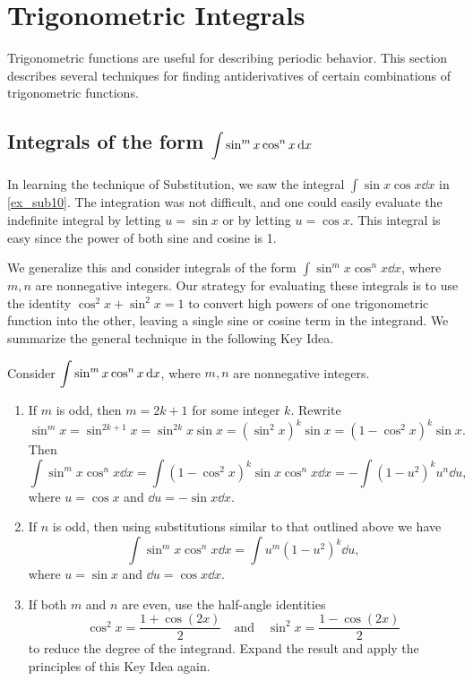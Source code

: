 

\section{Trigonometric Integrals}\label{sec:trigint}

Trigonometric functions are useful for describing periodic behavior. This section describes several techniques for finding antiderivatives of certain combinations of trigonometric functions.

\subsection{Integrals of the form \texorpdfstring{$\displaystyle \int \sin^m x\cos^n x\operatorname{d}\! x$}{∫(sin x)\^{}m (cos x)\^{}n dx}}

In learning the technique of Substitution, we saw the integral $\int \sin x\cos x\dd x$ in \autoref{ex_sub10}. The integration was not difficult, and one could easily evaluate the indefinite integral by letting $u=\sin x$ or by letting $u = \cos x$. This integral is easy since the power of both sine and cosine is 1.

We generalize this and consider integrals of the form $\int \sin^mx\cos^nx\dd x$, where $m,n$ are nonnegative integers. Our strategy for evaluating these integrals is to use the identity $\cos^2x+\sin^2x=1$ to convert high powers of one trigonometric function into the other, leaving a single sine or cosine term in the integrand. We summarize the general technique in the following Key Idea.



{%
\begin{keyidea}\label{idea:trig_int_1}%
Consider $\displaystyle \int \sin^mx\cos^nx\operatorname{d}\! x$, where $m,n$ are nonnegative integers.
\begin{enumerate}
	\item	If $m$ is odd, then $m=2k+1$ for some integer $k$. Rewrite \small
		\[
		\sin^mx = \sin^{2k+1}x = \sin^{2k}x\sin x = (\sin^2x)^k\sin x = (1-\cos^2x)^k\sin x.
		\]
		\normalsize Then \small
		\[
		\int \sin^mx\cos^nx\dd x = \int (1-\cos^2x)^k\sin x\cos^nx\dd x = -\int (1-u^2)^ku^n\dd u,
		\]
		\normalsize where $u = \cos x$ and $\dd u = -\sin x\dd x$. 
	\item	If $n$ is odd, then using substitutions similar to that outlined above we have \small
		\[\int \sin^mx\cos^nx\dd x = \int u^m(1-u^2)^k\dd u,\]
		\normalsize where $u = \sin x$ and $\dd u = \cos x\dd x$.
	\item	If both $m$ and $n$ are even, use the half-angle identities \small
		\[
		\cos^2x = \frac{1+\cos (2x)}{2} \quad \text{and}\quad \sin^2x = \frac{1-\cos(2x)}2
		\]
		\normalsize to reduce the degree of the integrand. Expand the result and apply the principles of this Key Idea again.
	\end{enumerate}
\end{keyidea}%
}

